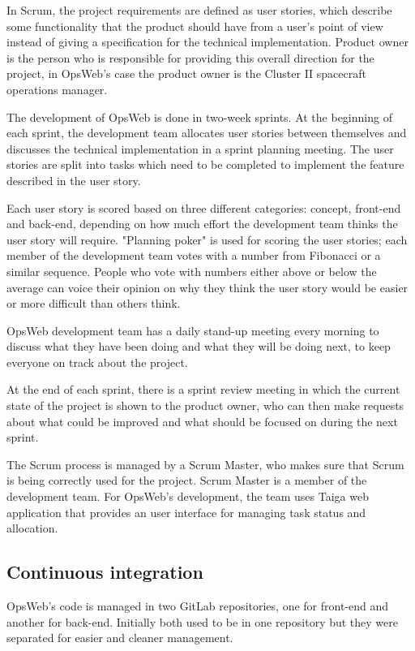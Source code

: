 In Scrum, the project requirements are defined as user stories, which describe some functionality that the product should have from a user's point of view instead of giving a specification for the technical implementation. Product owner is the person who is responsible for providing this overall direction for the project, in OpsWeb's case the product owner is the Cluster II spacecraft operations manager.

The development of OpsWeb is done in two-week sprints. At the beginning of each sprint, the development team allocates user stories between themselves and discusses the technical implementation in a sprint planning meeting. The user stories are split into tasks which need to be completed to implement the feature described in the user story. 

Each user story is scored based on three different categories: concept, front-end and back-end, depending on how much effort the development team thinks the user story will require. "Planning poker" is used for scoring the user stories; each member of the development team votes with a number from Fibonacci or a similar sequence. People who vote with numbers either above or below the average can voice their opinion on why they think the user story would be easier or more difficult than others think. \cite{grenning2002planning}

OpsWeb development team has a daily stand-up meeting every morning to discuss what they have been doing and what they will be doing next, to keep everyone on track about the project.

At the end of each sprint, there is a sprint review meeting in which the current state of the project is shown to the product owner, who can then make requests about what could be improved and what should be focused on during the next sprint.

The Scrum process is managed by a Scrum Master, who makes sure that Scrum is being correctly used for the project. Scrum Master is a member of the development team. \cite{beck2001manifesto, scrum} For OpsWeb's development, the team uses Taiga web application that provides an user interface for managing task status and allocation.  \cite{taiga}

\subsection{Continuous integration}
OpsWeb's code is managed in two GitLab repositories, one for front-end and another for back-end. Initially both used to be in one repository but they were separated for easier and cleaner management.

